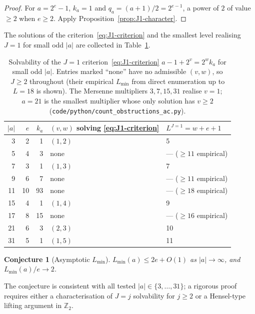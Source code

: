 \documentclass[11pt,reqno]{amsart}
\theoremstyle{plain}
\newtheorem{conjecture}[theorem]{Conjecture}
\theoremstyle{definition}
\theoremstyle{remark}
\newcommand{\Ztwo}{\mathbb{Z}_{2}}
\newcommand{\srcpath}[1]{\nolinkurl{#1}}
\begin{document}
\begin{proof}
For $a = 2^e - 1$, $k_a = 1$ and $q_a = (a + 1)/2 = 2^{e-1}$, a power of
$2$ of value $\ge 2$ when $e \ge 2$. Apply
Proposition~\ref{prop:J1-character}. \qedhere
\end{proof}

The solutions of the criterion~\eqref{eq:J1-criterion} and the smallest
level realising $J = 1$ for small odd $\lvert a \rvert$ are collected in
Table~\ref{tab:J1}.

\begin{table}[ht]
\centering
\begin{tabular}{rrrll}
\toprule
$\lvert a \rvert$ & $e$ & $k_a$ & $(v, w)$ solving \eqref{eq:J1-criterion} & $L^{J=1} = w + e + 1$ \\
\midrule
3 & 2 & 1 & $(1, 2)$ & 5 \\
5 & 4 & 3 & none & --- ($\ge 11$ empirical) \\
7 & 3 & 1 & $(1, 3)$ & 7 \\
9 & 6 & 7 & none & --- ($\ge 11$ empirical) \\
11 & 10 & 93 & none & --- ($\ge 18$ empirical) \\
15 & 4 & 1 & $(1, 4)$ & 9 \\
17 & 8 & 15 & none & --- ($\ge 16$ empirical) \\
21 & 6 & 3 & $(2, 3)$ & 10 \\
31 & 5 & 1 & $(1, 5)$ & 11 \\
\bottomrule
\end{tabular}
\caption{Solvability of the $J = 1$ criterion~\eqref{eq:J1-criterion}
$a - 1 + 2^v = 2^w k_a$ for small odd $\lvert a \rvert$. Entries marked
``none'' have no admissible $(v, w)$, so $J \ge 2$ throughout (their
empirical $L_{\min}$ from direct enumeration up to $L = 18$ is shown). The
Mersenne multipliers $3, 7, 15, 31$ realise $v = 1$; $a = 21$ is the
smallest multiplier whose only solution has $v \ge 2$
(\srcpath{code/python/count_obstructions_ac.py}).}
\label{tab:J1}
\end{table}

\begin{conjecture}[Asymptotic $L_{\min}$]\label{conj:Lmin-asymptotic}
$L_{\min}(a) \le 2e + O(1)$ as $\lvert a \rvert \to \infty$, and
$L_{\min}(a)/e \to 2$.
\end{conjecture}

The conjecture is consistent with all tested $\lvert a \rvert \in \{3,
\ldots, 31\}$; a rigorous proof requires either a characterisation of
$J = j$ solvability for $j \ge 2$ or a Hensel-type lifting argument in
$\Ztwo$.
\end{document}
